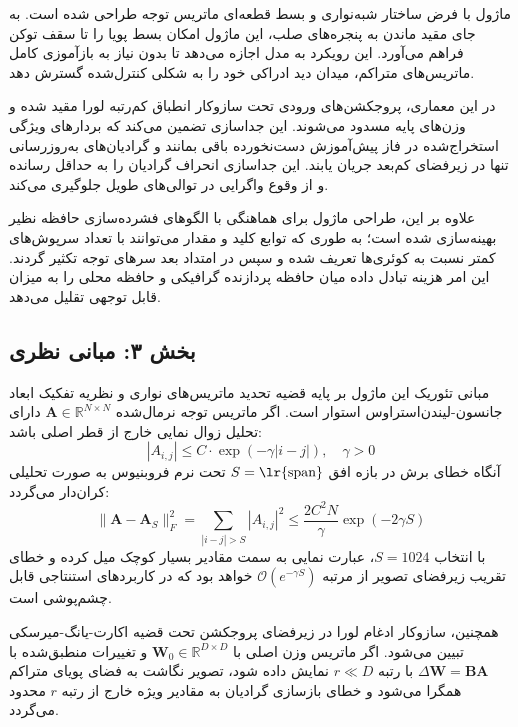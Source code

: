 ماژول  با فرض ساختار شبه‌نواری و بسط قطعه‌ای ماتریس توجه طراحی شده است. به جای مقید ماندن به پنجره‌های صلب، این ماژول امکان بسط پویا را تا سقف  توکن  فراهم می‌آورد. این رویکرد به مدل اجازه می‌دهد تا بدون نیاز به بازآموزی کامل ماتریس‌های متراکم، میدان دید ادراکی خود را به شکلی کنترل‌شده گسترش دهد.

در این معماری، پروجکشن‌های ورودی تحت سازوکار انطباق کم‌رتبه لورا مقید شده و وزن‌های پایه مسدود می‌شوند. این جداسازی تضمین می‌کند که بردارهای ویژگی استخراج‌شده در فاز پیش‌آموزش دست‌نخورده باقی بمانند و گرادیان‌های به‌روزرسانی تنها در زیرفضای کم‌بعد جریان یابند. این جداسازی انحراف گرادیان را به حداقل رسانده و از وقوع واگرایی در توالی‌های طویل جلوگیری می‌کند.

علاوه بر این، طراحی ماژول برای هماهنگی با الگوهای فشرده‌سازی حافظه نظیر  بهینه‌سازی شده است؛ به طوری که توابع کلید و مقدار می‌توانند با تعداد سرپوش‌های کمتر نسبت به کوئری‌ها تعریف شده و سپس در امتداد بعد سرهای توجه تکثیر گردند. این امر هزینه تبادل داده میان حافظه پردازنده گرافیکی و حافظه محلی را به میزان قابل توجهی تقلیل می‌دهد.

\subsection*{بخش ۳: مبانی نظری }
مبانی تئوریک این ماژول بر پایه قضیه تحدید ماتریس‌های نواری و نظریه تفکیک ابعاد جانسون-لیندن‌استراوس  استوار است. اگر ماتریس توجه نرمال‌شده $\mathbf{A} \in \mathbb{R}^{N \times N}$ دارای تحلیل زوال نمایی خارج از قطر اصلی باشد:
\begin{equation}
|A_{i,j}| \le C \cdot \exp(-\gamma |i - j|), \quad \gamma > 0
\end{equation}
آنگاه خطای برش در بازه افق $S = \text{\lr{span}}$ تحت نرم فروبنیوس به صورت تحلیلی کران‌دار می‌گردد:
\begin{equation}
\|\mathbf{A} - \mathbf{A}_S\|_F^2 = \sum_{|i-j| > S} |A_{i,j}|^2 \le \frac{2 C^2 N}{\gamma} \exp(-2\gamma S)
\end{equation}
با انتخاب $S = 1024$، عبارت نمایی به سمت مقادیر بسیار کوچک میل کرده و خطای تقریب زیرفضای تصویر از مرتبه $\mathcal{O}(e^{-\gamma S})$ خواهد بود که در کاربردهای استنتاجی قابل چشم‌پوشی است.

همچنین، سازوکار ادغام لورا در زیرفضای پروجکشن تحت قضیه اکارت-یانگ-میرسکی تبیین می‌شود. اگر ماتریس وزن اصلی با $\mathbf{W}_0 \in \mathbb{R}^{D \times D}$ و تغییرات منطبق‌شده با $\Delta \mathbf{W} = \mathbf{B}\mathbf{A}$ با رتبه $r \ll D$ نمایش داده شود، تصویر نگاشت به فضای پویای متراکم همگرا می‌شود و خطای بازسازی گرادیان به مقادیر ویژه خارج از رتبه $r$ محدود می‌گردد.

